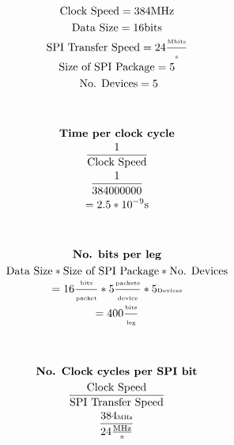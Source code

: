                 \begin{figure}[!t]
                \begin{minipage}{0.5\textwidth}
                    \begin{gather*}
                        \text{Clock Speed} = 384 \text{MHz}\\
                        \text{Data Size} = 16 \text{bits}\\
                        \text{SPI Transfer Speed} = 24 \tiny{\frac{\text{Mbits}}{\text{s}}}\\
                        \text{Size of SPI Package}= 5\\
                        \text{ No. Devices} = 5\\
                        \\
                        \\
                        \textbf{Time per clock cycle}\\
                        \frac{1}{\text{Clock Speed}}\\
                        \frac{1}{384000000}\\
                        = 2.5*10^{-9}\text{s}\\
                        \\
                        \\
                        \textbf{No. bits per leg}\\
                        \text{Data Size} * \text{Size of SPI Package} * \text{No. Devices}\\
                        = 16 \tiny{\frac{\text{bits}}{\tiny{\text{packet}}}} * 5\frac{\text{packets}}{\text{device}} * 5\text{Devices} \\
                        = 400 \tiny{\frac{\text{bits}}{\text{leg}}}\\
                        \\
                        \\
                    \end{gather*} 
                \end{minipage}
                \begin{minipage}{0.5\textwidth}
                    \begin{gather*} 
                        \textbf{No. Clock cycles per SPI bit}\\
                        \frac{\text{Clock Speed}}{\text{SPI	Transfer Speed}}\\
                        \tiny{\frac{384\text{MHz}}{24\frac{\text{MHz}}{\text{s}}}}\\ 

\end{gather*}
\end{minipage}
\end{figure}
